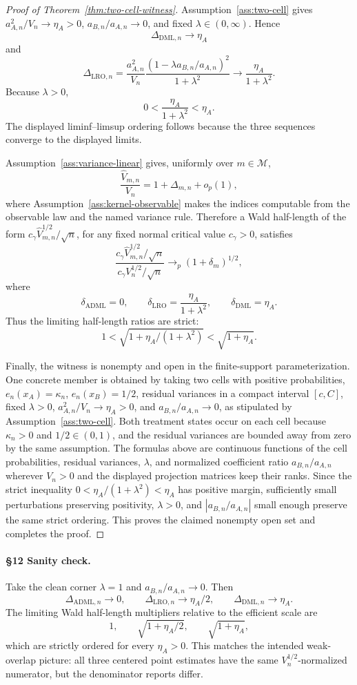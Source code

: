 \begin{proof}[Proof of Theorem~\ref{thm:two-cell-witness}]
Assumption~\ref{ass:two-cell} gives \(a_{A,n}^2/V_n\to\eta_A>0\), \(a_{B,n}/a_{A,n}\to0\), and fixed \(\lambda\in(0,\infty)\).  Hence
\[
  \Delta_{\mathrm{DML},n}\to\eta_A
\]
and
\[
  \Delta_{\mathrm{LRO},n}
  =
  \frac{a_{A,n}^2}{V_n}
  \frac{(1-\lambda a_{B,n}/a_{A,n})^2}{1+\lambda^2}
  \to
  \frac{\eta_A}{1+\lambda^2}.
\]
Because \(\lambda>0\),
\[
  0<\frac{\eta_A}{1+\lambda^2}<\eta_A.
\]
The displayed liminf--limsup ordering follows because the three sequences converge to the displayed limits.

Assumption~\ref{ass:variance-linear} gives, uniformly over \(m\in\mathcal M\),
\[
  \frac{\hat V_{m,n}}{V_n}=1+\Delta_{m,n}+o_p(1),
\]
where Assumption~\ref{ass:kernel-observable} makes the indices computable from the observable law and the named variance rule.  Therefore a Wald half-length of the form \(c_\gamma\hat V_{m,n}^{1/2}/\sqrt n\), for any fixed normal critical value \(c_\gamma>0\), satisfies
\[
  \frac{c_\gamma\hat V_{m,n}^{1/2}/\sqrt n}{c_\gamma V_n^{1/2}/\sqrt n}
  \to_p
  (1+\delta_m)^{1/2},
\]
where
\[
  \delta_{\mathrm{ADML}}=0,\qquad
  \delta_{\mathrm{LRO}}=\frac{\eta_A}{1+\lambda^2},\qquad
  \delta_{\mathrm{DML}}=\eta_A.
\]
Thus the limiting half-length ratios are strict:
\[
  1
  <
  \sqrt{1+\eta_A/(1+\lambda^2)}
  <
  \sqrt{1+\eta_A}.
\]

Finally, the witness is nonempty and open in the finite-support parameterization.  One concrete member is obtained by taking two cells with positive probabilities, \(e_n(x_A)=\kappa_n\), \(e_n(x_B)=1/2\), residual variances in a compact interval \([c,C]\), fixed \(\lambda>0\), \(a_{A,n}^2/V_n\to\eta_A>0\), and \(a_{B,n}/a_{A,n}\to0\), as stipulated by Assumption~\ref{ass:two-cell}.  Both treatment states occur on each cell because \(\kappa_n>0\) and \(1/2\in(0,1)\), and the residual variances are bounded away from zero by the same assumption.  The formulas above are continuous functions of the cell probabilities, residual variances, \(\lambda\), and normalized coefficient ratio \(a_{B,n}/a_{A,n}\) wherever \(V_n>0\) and the displayed projection matrices keep their ranks.  Since the strict inequality \(0<\eta_A/(1+\lambda^2)<\eta_A\) has positive margin, sufficiently small perturbations preserving positivity, \(\lambda>0\), and \(|a_{B,n}/a_{A,n}|\) small enough preserve the same strict ordering.  This proves the claimed nonempty open set and completes the proof.
\end{proof}

\paragraph{\S12 Sanity check.}
Take the clean corner \(\lambda=1\) and \(a_{B,n}/a_{A,n}\to0\).  Then
\[
  \Delta_{\mathrm{ADML},n}\to0,\qquad
  \Delta_{\mathrm{LRO},n}\to\eta_A/2,\qquad
  \Delta_{\mathrm{DML},n}\to\eta_A.
\]
The limiting Wald half-length multipliers relative to the efficient scale are
\[
  1,\qquad \sqrt{1+\eta_A/2},\qquad \sqrt{1+\eta_A},
\]
which are strictly ordered for every \(\eta_A>0\).  This matches the intended weak-overlap picture: all three centered point estimates have the same \(V_n^{1/2}\)-normalized numerator, but the denominator reports differ.

